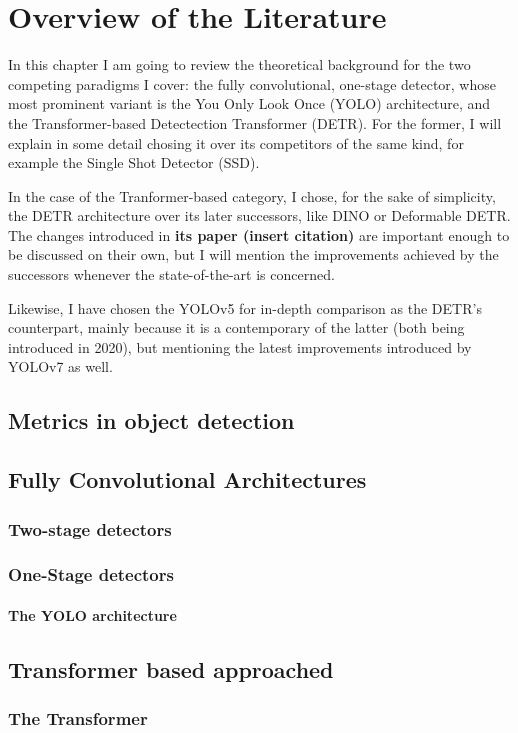 \chapter{Overview of the Literature}

In this chapter I am going to review the theoretical background for the two competing paradigms I cover: the fully convolutional, one-stage detector, whose most prominent variant is the You Only Look Once (YOLO) architecture, and the Transformer-based Detectection Transformer (DETR). For the former, I will explain in some detail chosing it over its competitors of the same kind, for example the Single Shot Detector (SSD).

In the case of the Tranformer-based category, I chose, for the sake of simplicity, the DETR architecture over its later successors, like DINO or Deformable DETR. The changes introduced in \textbf{its paper (insert citation)} are important enough to be discussed on their own, but I will mention the improvements achieved by the successors whenever the state-of-the-art is concerned.

Likewise, I have chosen the YOLOv5 for in-depth comparison as the DETR's counterpart, mainly because it is a contemporary of the latter (both being introduced in 2020), but mentioning the latest improvements introduced by YOLOv7 as well.

\section{Metrics in object detection}
\section{Fully Convolutional Architectures}
\subsection{Two-stage detectors}
\subsection{One-Stage detectors}
\subsubsection{The YOLO architecture}
\section{Transformer based approached}
\subsection{The Transformer}

